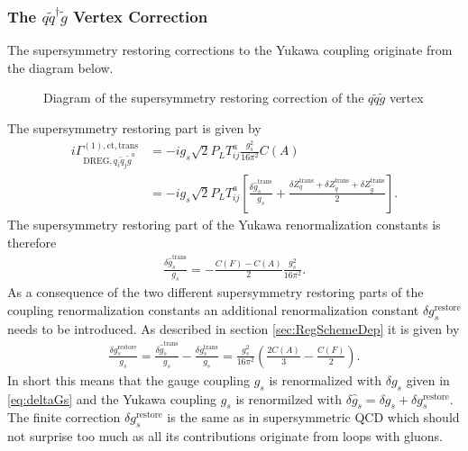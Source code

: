 \subsubsection*{The $q\tilde{q}^\dagger\tilde{g}$ Vertex Correction}
The supersymmetry restoring corrections to the Yukawa coupling originate from the diagram below.
\begin{figure}[!htbp]
\begin{center}
\caption{Diagram of the supersymmetry restoring correction of  the $q\tilde{q}\tilde{g}$ vertex}
\end{center}
\end{figure}
The supersymmetry restoring part is given by
\begin{align}
i\Gamma^{\mathrm{(1),ct,trans}}_{\mathrm{DREG}, q_i\tilde{q}_j\tilde{g}^a} &= -ig_s \sqrt{2} P_L T^a_{ij}  \frac{g_s^2}{16\pi^2}C(A)\\
&= -ig_s \sqrt{2} P_L T^a_{ij}  \left[ \frac{\delta \hat{g}_s^{\mathrm{trans}}}{g_s} + \frac{\delta Z^{\mathrm{trans}}_q + \delta Z^{\mathrm{trans}}_{\tilde{q}} + \delta Z^{\mathrm{trans}}_{\tilde{g}}}{2} \right].
\end{align}
The supersymmetry restoring part of the Yukawa renormalization constants is therefore
\begin{align}
\frac{\delta \hat{g}_s^{\mathrm{trans}}}{g_s} = -\frac{C(F)-C(A)}{2} \frac{g_s^2}{16\pi^2}.
\end{align}
As a consequence of the two different supersymmetry restoring parts of the coupling renormalization constants an additional renormalization constant $\delta g_s^{\mathrm{restore}}$ needs to be introduced. As described in section \ref{sec:RegSchemeDep} it is given by
\begin{align}
\frac{\delta g_s^{\mathrm{restore}}}{g_s} = \frac{\delta \hat{g}_s^{\mathrm{trans}}}{g_s} -\frac{\delta g_s^{\mathrm{trans}}}{g_s} = \frac{g_s^2}{16\pi^2}\left( \frac{2C(A)}{3} - \frac{C(F)}{2} \right).
\end{align}
In short this means that the gauge coupling $g_s$ is renormalized with $\delta g_s$ given in \eqref{eq:deltaGs} and the Yukawa coupling $\hat{g}_s$ is renormilzed with $\delta \hat{g}_s = \delta g_s + \delta g_s^{\mathrm{restore}}$.\\
The finite correction $\delta g_s^{\mathrm{restore}}$ is the same as in supersymmetric QCD which should not surprise too much as all its contributions originate from loops with gluons.%


